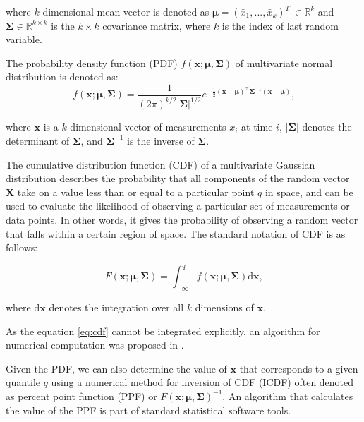where $k$-dimensional mean vector is denoted as \(\boldsymbol\mu = (\bar x_{1},...,\bar x_{k})^T\ \in \mathbb{R}^{k}\) and \(\boldsymbol\Sigma \in \mathbb{R}^{k\times{k}}\) is the $k \times k$ covariance matrix, where \(k\) is the index of last random variable.

The probability density function (PDF) \(f(\boldsymbol{x}; \boldsymbol{\mu}, \boldsymbol{\Sigma})\) of multivariate normal distribution is denoted as:
\begin{equation}
f(\boldsymbol{x}; \boldsymbol{\mu}, \boldsymbol{\Sigma}) = \frac{1}{(2\pi)^{k/2} |\boldsymbol{\Sigma}|^{1/2}} e^{-\frac{1}{2} (\boldsymbol{x}-\boldsymbol{\mu})^\top \boldsymbol{\Sigma}^{-1} (\boldsymbol{x}-\boldsymbol{\mu})}\text{,}
\end{equation}

where $\boldsymbol{x}$ is a $k$-dimensional vector of measurements $x_i$ at time $i$, $|\boldsymbol{\Sigma}|$ denotes the determinant of $\boldsymbol{\Sigma}$, and $\boldsymbol{\Sigma}^{-1}$ is the inverse of $\boldsymbol{\Sigma}$.

The cumulative distribution function (CDF) of a multivariate Gaussian distribution describes the probability that all components of the random vector \(\boldsymbol{X}\) take on a value less than or equal to a particular point \(q\) in space, and can be used to evaluate the likelihood of observing a particular set of measurements or data points. In other words, it gives the probability of observing a random vector that falls within a certain region of space. The standard notation of CDF is as follows:

\begin{equation}
F(\boldsymbol{x}; \boldsymbol{\mu}, \boldsymbol{\Sigma}) = \int_{-\infty}^{q} f(\boldsymbol{x}; \boldsymbol{\mu}, \boldsymbol{\Sigma}) \text{d}\boldsymbol{x}\text{,}\label{eq:cdf}
\end{equation}

where $\text{d}\boldsymbol{x}$ denotes the integration over all $k$ dimensions of $\boldsymbol{x}$.

As the equation \eqref{eq:cdf} cannot be integrated explicitly, an algorithm for numerical computation was proposed in \citet{Genz2000}.

Given the PDF, we can also determine the value of \(\boldsymbol{x}\) that corresponds to a given quantile $q$ using a numerical method for inversion of CDF (ICDF) often denoted as percent point function (PPF) or $F(\boldsymbol{x}; \boldsymbol{\mu}, \boldsymbol{\Sigma})^{-1}$. An algorithm that calculates the value of the PPF is part of standard statistical software tools.

